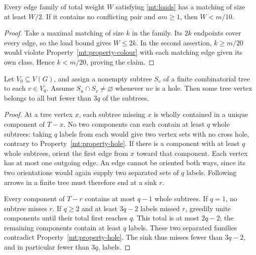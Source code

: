 \begin{lemma}\label{mt:load-matching}
Every edge family of total weight \(W\) satisfying
\eqref{mt:loads} has a matching of size at least \(W/2\).
If it contains no conflicting pair and \(am\ge1\), then
\(W<m/10\).
\end{lemma}
\begin{proof}
Take a maximal matching of size \(k\) in the family.  Its \(2k\)
endpoints cover every edge, so the load bound gives \(W\le2k\).
In the second assertion, \(k\ge m/20\) would violate
Property~\ref{mt:property-colour} with each matching edge given its
own class.  Hence \(k<m/20\), proving the claim.
\end{proof}

\begin{lemma}\label{mt:single-bag}
Let \(V_0\subseteq V(G)\), and assign a nonempty subtree
\(S_v\) of a finite combinatorial tree to each \(v\in V_0\).
Assume \(S_u\cap S_v\ne\varnothing\) whenever \(uv\) is a hole.
Then some tree vertex belongs to all but fewer than \(3q\) of the
subtrees.
\end{lemma}
\begin{proof}
At a tree vertex \(x\), each subtree missing \(x\) is wholly
contained in a unique component of \(T-x\).  No two components
can each contain at least \(q\) whole subtrees: taking \(q\) labels
from each would give two vertex sets with no cross hole, contrary
to Property~\ref{mt:property-hole}.  If there is a component with
at least \(q\) whole subtrees, orient the first edge from \(x\)
toward that component.  Each vertex has at most one outgoing edge.
An edge cannot be oriented both ways, since its two orientations
would again supply two separated sets of \(q\) labels.  Following
arrows in a finite tree must therefore end at a sink \(r\).

Every component of \(T-r\) contains at most \(q-1\) whole
subtrees.  If \(q=1\), no subtree misses \(r\).  If \(q\ge2\)
and at least \(3q-2\) labels missed \(r\), greedily unite components
until their total first reaches \(q\).  This total is at most
\(2q-2\); the remaining components contain at least \(q\) labels.
These two separated families contradict
Property~\ref{mt:property-hole}.  The sink thus misses fewer than
\(3q-2\), and in particular fewer than \(3q\), labels.
\end{proof}

